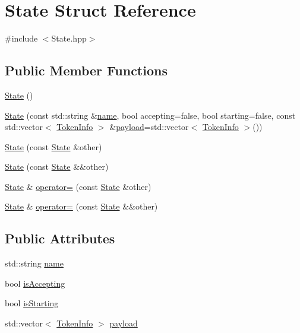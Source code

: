 \hypertarget{structState}{}\section{State Struct Reference}
\label{structState}


{\ttfamily \#include $<$State.\+hpp$>$}

\subsection*{Public Member Functions}
\begin{DoxyCompactItemize}
\item 
\hyperlink{structState_ab91bb1dd5aa6260ab2a456581daf9ec2}{State} ()
\item 
\hyperlink{structState_aa9d973d416d8de54bc8234b35bf5d602}{State} (const std\+::string \&\hyperlink{structState_ad57f19fd0a86f129840d8739253d2c72}{name}, bool accepting=false, bool starting=false, const std\+::vector$<$ \hyperlink{structTokenInfo}{Token\+Info} $>$ \&\hyperlink{structState_a19ea4225f19a3281e2d6c890b0c09312}{payload}=std\+::vector$<$ \hyperlink{structTokenInfo}{Token\+Info} $>$())
\item 
\hyperlink{structState_a7325c890ee133fde5ca26eb4cea1f8ce}{State} (const \hyperlink{structState}{State} \&other)
\item 
\hyperlink{structState_add87bf8cfa231b793bb0aa908fabf008}{State} (const \hyperlink{structState}{State} \&\&other)
\item 
\hyperlink{structState}{State} \& \hyperlink{structState_a57229f2db32144885eef8b7d8da598ef}{operator=} (const \hyperlink{structState}{State} \&other)
\item 
\hyperlink{structState}{State} \& \hyperlink{structState_ade935fb2b2db2cad19950bdefe374267}{operator=} (const \hyperlink{structState}{State} \&\&other)
\end{DoxyCompactItemize}
\subsection*{Public Attributes}
\begin{DoxyCompactItemize}
\item 
std\+::string \hyperlink{structState_ad57f19fd0a86f129840d8739253d2c72}{name}
\item 
bool \hyperlink{structState_ab48af65a07f9ae4dfb880bacfbd2e812}{is\+Accepting}
\item 
bool \hyperlink{structState_a578fb1731639aab7ee201241ac00b728}{is\+Starting}
\item 
std\+::vector$<$ \hyperlink{structTokenInfo}{Token\+Info} $>$ \hyperlink{structState_a19ea4225f19a3281e2d6c890b0c09312}{payload}
\end{DoxyCompactItemize}


